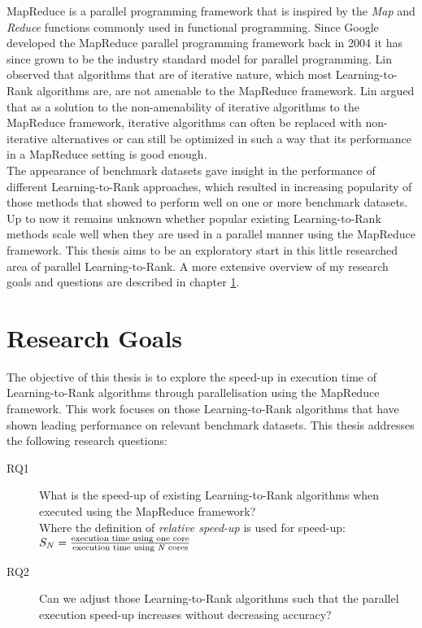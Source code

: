 MapReduce\cite{Dean2004} is a parallel programming framework that is inspired by the \emph{Map} and \emph{Reduce} functions commonly used in functional programming. Since Google developed the MapReduce parallel programming framework back in 2004 it has since grown to be the industry standard model for parallel programming. Lin \cite{Lin2013} observed that algorithms that are of iterative nature, which most Learning-to-Rank algorithms are, are not amenable to the MapReduce framework. Lin argued that as a solution to the non-amenability of iterative algorithms to the MapReduce framework, iterative algorithms can often be replaced with non-iterative alternatives or can still be optimized in such a way that its performance in a MapReduce setting is good enough.\\

The appearance of benchmark datasets gave insight in the performance of different Learning-to-Rank approaches, which resulted in increasing popularity of those methods that showed to perform well on one or more benchmark datasets. Up to now it remains unknown whether popular existing Learning-to-Rank methods scale well when they are used in a parallel manner using the MapReduce framework. This thesis aims to be an exploratory start in this little researched area of parallel Learning-to-Rank. A more extensive overview of my research goals and questions are described in chapter \ref{chap:goals}.\\

\chapter{Research Goals}
\label{chap:goals}
The objective of this thesis is to explore the speed-up in execution time of Learning-to-Rank algorithms through parallelisation using the MapReduce framework. 
This work focuses on those Learning-to-Rank algorithms that have shown leading performance on relevant benchmark datasets.
This thesis addresses the following research questions:
\begin{description}
\item[RQ1] What is the speed-up of existing Learning-to-Rank algorithms when executed using the MapReduce framework?\\
Where the definition of \emph{relative speed-up} is used for speed-up\cite{Sun1991}:\\

$S_N = \frac{\text{execution time using one core}}{\text{execution time using \emph{N} cores}}$

\item[RQ2] Can we adjust those Learning-to-Rank algorithms such that the parallel execution speed-up increases without decreasing accuracy?
\end{description}

